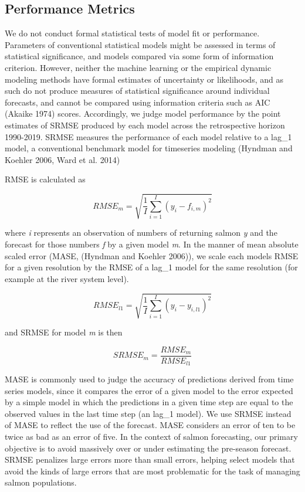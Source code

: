 \documentclass[
]{article}
\begin{document}
\hypertarget{performance-metrics}{%
\subsection*{Performance Metrics}\label{performance-metrics}}

We do not conduct formal statistical tests of model fit or performance. Parameters of conventional statistical models might be assessed in terms of statistical significance, and models compared via some form of information criterion. However, neither the machine learning or the empirical dynamic modeling methods have formal estimates of uncertainty or likelihoods, and as such do not produce measures of statistical significance around individual forecasts, and cannot be compared using information criteria such as AIC (Akaike 1974) scores. Accordingly, we judge model performance by the point estimates of SRMSE produced by each model across the retrospective horizon 1990-2019. SRMSE measures the performance of each model relative to a lag\_1 model, a conventional benchmark model for timeseries modeling (Hyndman and Koehler 2006, Ward et al. 2014)

RMSE is calculated as

\[RMSE_m = \sqrt{\frac{1}{I}\sum\limits_{i = 1}^I(y_{i} - f_{i,m})^2}\]

where \emph{i} represents an observation of numbers of returning salmon \emph{y} and the forecast for those numbers \emph{f} by a given model \emph{m}. In the manner of mean absolute scaled error (MASE, (Hyndman and Koehler 2006)), we scale each models RMSE for a given resolution by the RMSE of a lag\_1 model for the same resolution (for example at the river system level).

\[RMSE_{l1} = \sqrt{\frac{1}{I}\sum\limits_{i = 1}^I(y_{i} - y_{i,l1})^2}\]

and SRMSE for model \emph{m} is then

\[SRMSE_m = \frac{RMSE_m}{RMSE_{l1}}\]

MASE is commonly used to judge the accuracy of predictions derived from time series models, since it compares the error of a given model to the error expected by a simple model in which the predictions in a given time step are equal to the observed values in the last time step (an lag\_1 model). We use SRMSE instead of MASE to reflect the use of the forecast. MASE considers an error of ten to be twice as bad as an error of five. In the context of salmon forecasting, our primary objective is to avoid massively over or under estimating the pre-season forecast. SRMSE penalizes large errors more than small errors, helping select models that avoid the kinds of large errors that are most problematic for the task of managing salmon populations.
\end{document}
